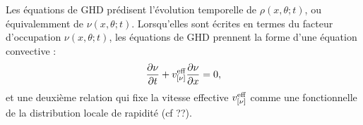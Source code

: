 Les équations de GHD \cite{bertini_transport_2016,castro-alvaredo_emergent_2016} prédisent l'évolution temporelle de $\rho(x,\theta ; t)$, ou équivalemment de $\nu(x,\theta ; t)$. Lorsqu'elles sont écrites en termes du facteur d'occupation $\nu(x,\theta ; t )$, les équations de GHD prennent la forme d'une équation convective :
\begin{equation}
\label{eq:nu.cont}
\frac{\partial \nu}{\partial t} + v^{\rm{eff}}_{[\nu]} \frac{\partial \nu}{\partial x} = 0 ,
\end{equation}
et une deuxième relation qui fixe la vitesse effective $v^{\rm{eff}}_{[\nu]}$ comme une fonctionnelle de la distribution locale de rapidité (cf {??}).
